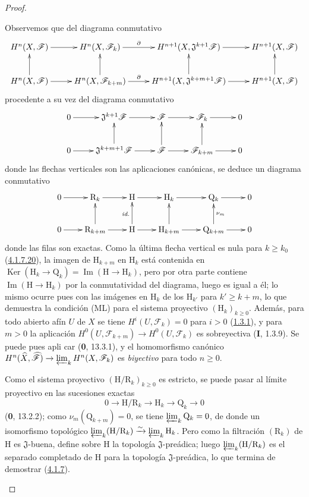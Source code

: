 \begin{proof}
\begin{env}[4.1.7.21]
\label{III.4.1.7.21-fr}
Observemos que del diagrama conmutativo
\[
\xymatrix@C=2.5em{
H^n(X,\mathcal F)\ar[r]&H^n(X,\mathcal F_k)\ar[r]^-\partial&
H^{n+1}(X,\mathfrak J^{k+1}\mathcal F)\ar[r]&H^{n+1}(X,\mathcal F)\\
H^n(X,\mathcal F)\ar[r]\ar[u]&H^n(X,\mathcal F_{k+m})\ar[r]^-\partial\ar[u]&
H^{n+1}(X,\mathfrak J^{k+m+1}\mathcal F)\ar[r]\ar[u]&
H^{n+1}(X,\mathcal F)\ar[u]
}
\]
procedente a su vez del diagrama conmutativo
\[
\xymatrix{
0\ar[r]&\mathfrak J^{k+1}\mathcal F\ar[r]&\mathcal F\ar[r]&
\mathcal F_k\ar[r]&0\\
0\ar[r]&\mathfrak J^{k+m+1}\mathcal F\ar[r]\ar[u]&
\mathcal F\ar[r]\ar[u]&\mathcal F_{k+m}\ar[r]\ar[u]&0
}
\]
donde las flechas verticales son las aplicaciones canónicas, se deduce un
diagrama conmutativo
\[
\xymatrix@C=2.2em{
0\ar[r]&\mathrm R_k\ar[r]&\mathrm H\ar[r]&\mathrm H_k\ar[r]&
\mathrm Q_k\ar[r]&0\\
0\ar[r]&\mathrm R_{k+m}\ar[r]\ar[u]&\mathrm H\ar[r]\ar[u]^{\textit{id.}}&
\mathrm H_{k+m}\ar[r]\ar[u]&\mathrm Q_{k+m}\ar[r]\ar[u]_{\nu_m}&0
}
\]
donde las filas son exactas. Como la última flecha vertical es nula
para $k\geq k_0$ (\hyperref[III.4.1.7.20-fr]{4.1.7.20}), la imagen de
$\mathrm H_{k+m}$ en $\mathrm H_k$ está contenida en
$\operatorname{Ker}(\mathrm H_k\to\mathrm Q_k)
=\operatorname{Im}(\mathrm H\to\mathrm H_k)$, pero por otra parte
contiene $\operatorname{Im}(\mathrm H\to\mathrm H_k)$ por la conmutatividad
del diagrama, luego es igual a él; lo mismo ocurre pues con las imágenes
en $\mathrm H_k$ de los $\mathrm H_{k'}$ para $k'\geq k+m$, lo que demuestra
la condición (ML) para el sistema proyectivo $(\mathrm H_k)_{k\geq0}$. Además,
para todo abierto afín $U$ de $X$ se tiene
$H^i(U,\mathcal F_k)=0$ para $i>0$
(\hyperref[III.1.3.1-fr]{1.3.1}), y para $m>0$ la aplicación
$H^0(U,\mathcal F_{k+m})\to H^0(U,\mathcal F_k)$ es sobreyectiva
(\textbf{I}, 1.3.9). Se puede pues apli%
car (\textbf{0}, 13.3.1), y el homomorfismo canónico
$H^n(\widehat X,\widehat{\mathcal F})\to
\varprojlim_kH^n(X,\mathcal F_k)$ es \emph{biyectivo} para todo $n\geq0$.

Como el sistema proyectivo $(\mathrm H/\mathrm R_k)_{k\geq0}$ es estricto,
se puede pasar al límite proyectivo en las sucesiones exactas
\[
0\longrightarrow\mathrm H/\mathrm R_k\longrightarrow\mathrm H_k
\longrightarrow\mathrm Q_k\longrightarrow0
\tag{4.1.7.22}\label{III.4.1.7.22-fr}
\]
(\textbf{0}, 13.2.2); como $\nu_m(\mathrm Q_{k+m})=0$, se tiene
$\varprojlim_k\mathrm Q_k=0$, de donde un isomorfismo topológico
$\varprojlim_k(\mathrm H/\mathrm R_k)\xrightarrow{\sim}
\varprojlim_k\mathrm H_k$.
Pero como la filtración $(\mathrm R_k)$ de $\mathrm H$ es
$\mathfrak J$-buena, define sobre $\mathrm H$ la topología
$\mathfrak J$-preádica; luego $\varprojlim_k(\mathrm H/\mathrm R_k)$ es
el separado completado de $\mathrm H$ para la topología
$\mathfrak J$-preádica, lo que termina de demostrar
(\hyperref[III.4.1.7-fr]{4.1.7}).
\end{env}
\end{proof}

